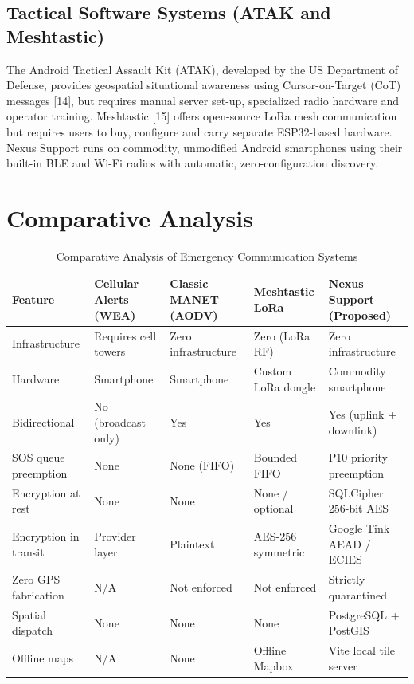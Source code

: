 \documentclass[12pt,a4paper]{report}
\begin{document}
\subsection{Tactical Software Systems (ATAK and Meshtastic)}
The Android Tactical Assault Kit (ATAK), developed by the US Department of Defense, provides geospatial situational awareness using Cursor-on-Target (CoT) messages [14], but requires manual server set-up, specialized radio hardware and operator training. Meshtastic [15] offers open-source LoRa mesh communication but requires users to buy, configure and carry separate ESP32-based hardware. Nexus Support runs on commodity, unmodified Android smartphones using their built-in BLE and Wi-Fi radios with automatic, zero-configuration discovery.

\section{Comparative Analysis}

\begin{table}[htbp]
\centering
\small
\caption{Comparative Analysis of Emergency Communication Systems}
\label{tab:lit_comparison}
\renewcommand{\arraystretch}{1.3}
\begin{tabularx}{\textwidth}{|>{\raggedright\arraybackslash}p{2.5cm}|>{\raggedright\arraybackslash}X|>{\raggedright\arraybackslash}X|>{\raggedright\arraybackslash}X|>{\raggedright\arraybackslash}X|}
\hline
\textbf{Feature} & \textbf{Cellular Alerts (WEA)} & \textbf{Classic MANET (AODV)} & \textbf{Meshtastic LoRa} & \textbf{Nexus Support (Proposed)} \\
\hline
Infrastructure & Requires cell towers & Zero infrastructure & Zero (LoRa RF) & Zero infrastructure \\
\hline
Hardware & Smartphone & Smartphone & Custom LoRa dongle & Commodity smartphone \\
\hline
Bidirectional & No (broadcast only) & Yes & Yes & Yes (uplink + downlink) \\
\hline
SOS queue preemption & None & None (FIFO) & Bounded FIFO & P10 priority preemption \\
\hline
Encryption at rest & None & None & None / optional & SQLCipher 256-bit AES \\
\hline
Encryption in transit & Provider layer & Plaintext & AES-256 symmetric & Google Tink AEAD / ECIES \\
\hline
Zero GPS fabrication & N/A & Not enforced & Not enforced & Strictly quarantined \\
\hline
Spatial dispatch & None & None & None & PostgreSQL + PostGIS \\
\hline
Offline maps & N/A & None & Offline Mapbox & Vite local tile server \\
\hline
\end{tabularx}
\end{table}
\end{document}
